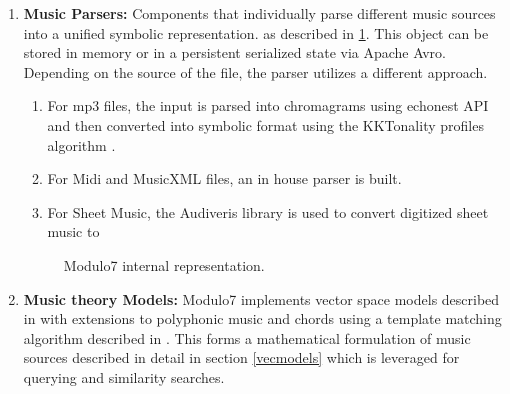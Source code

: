 \documentclass{article}
\begin{document}
\begin{enumerate}
\item \textbf{Music Parsers: } Components that individually parse different music sources into a unified symbolic representation. as described in \ref{fig:document}. This object can be stored in memory or in a persistent serialized state via Apache Avro. Depending on the source of the file, the parser utilizes a different approach.
\begin{enumerate}
\item For mp3 files, the input is parsed into chromagrams using echonest API and then converted into symbolic format using the KKTonality profiles algorithm \cite{kkTonalityKeyFinding}. 
\item For Midi and MusicXML files, an in house parser is built. 
\item For Sheet Music, the Audiveris library is used to convert digitized sheet music to 

\end{enumerate}

\begin{figure}[h]
\begin{center}
 {}
 \caption{Modulo7 internal representation.}
 \label{fig:document}
\end{center}
\end{figure}

\item \textbf{Music theory Models: } Modulo7 implements vector space models described in \cite{similie} with extensions to polyphonic music and chords using a template matching algorithm described in \cite{chord-detection}. This forms a mathematical formulation of music sources described in detail in section \ref{vecmodels} which is leveraged for querying and similarity searches.


\end{enumerate}
\end{document}
